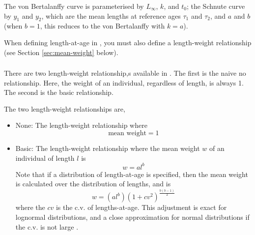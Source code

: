 The von Bertalanffy curve is parameterised by $L_\infty$, $k$, and $t_0$; the Schnute curve \citep{836} by $y_1$ and $y_2$, which are the mean lengths at reference ages $\tau_1$ and $\tau_2$, and $a$ and $b$ (when $b=1$, this reduces to the von Bertalanffy with $k=a$). 

When defining length-at-age in \CNAME, you must also define a length-weight relationship (see Section \ref{sec:mean-weight} below).

\subsubsection*{}
\subsubsection*{}

\subsubsection*{\label{sec:mean-weight}}

There are two length-weight relationship,s available in \CNAME. The first is the naive no relationship. Here, the weight of an individual, regardless of length, is always 1. The second is the basic relationship. 

The two length-weight relationships are,

\begin{itemize}
  \item{None:} The length-weight relationship where  
  \begin{equation}
    \text{mean weight}=1
  \end{equation}
  \item{Basic:} The length-weight relationship where the mean weight $w$ of an individual of length $l$ is
  \begin{equation}
    w=a l^b
  \end{equation}
	Note that if a distribution of length-at-age is specified, then the mean weight is calculated over the distribution of lengths, and is
  \begin{equation}
	  w=(al^b)(1+cv^2)^{\frac{b(b-1)}{2}}
  \end{equation}
	where the $cv$ is the c.v. of lengths-at-age. This adjustment is exact for lognormal distributions, and a close approximation for normal distributions if the c.v. is not large \citep{1388}.
\end{itemize}

